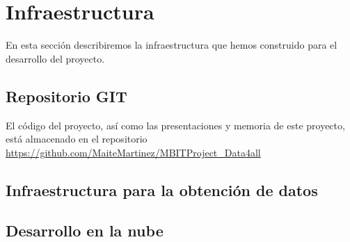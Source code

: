 \chapter{Infraestructura}
En esta sección describiremos la infraestructura que hemos construido para el desarrollo del proyecto.
\section{Repositorio GIT}
El código del proyecto, así como las presentaciones y memoria de este proyecto, está almacenado en el 
repositorio \url{https://github.com/MaiteMartinez/MBITProject_Data4all}


\section{Infraestructura para la obtención de datos}
\section{Desarrollo en la nube}
